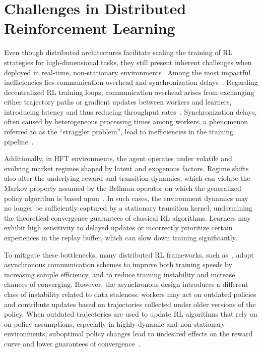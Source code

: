 \section{Challenges in Distributed Reinforcement Learning}
\label{sec:challenges}

Even though distributed architectures facilitate scaling the training of RL strategies for
high-dimensional tasks, they still present inherent challenges when deployed in real-time, non-stationary environments~\citep{He2022, Jia2024}
Among the most impactful inefficiencies lies communication overhead and synchronization delays~\citep{Song2023}.
Regarding decentralized RL training loops, communication overhead arises from exchanging either trajectory paths or gradient updates
between workers and learners, introducing latency and thus reducing throughput rates~\citep{Espeholt2018}.
Synchronization delays, often caused by heterogeneous processing times among workers, a phenomenon referred to as the ``straggler problem'',
lead to inefficiencies in the training pipeline~\citep{Lu2021}.

Additionally, in HFT environments, the agent operates under volatile and evolving market regimes shaped by latent and exogenous factors.
Regime shifts also alter the underlying reward and transition dynamics, which can violate the Markov property assumed by the Bellman operator
on which the generalized policy algorithm is based upon~\citep{Rabindrajit2024}.
In such cases, the environment dynamics may no longer be sufficiently captured by a stationary transition kernel,
undermining the theoretical convergence guarantees of classical RL algorithms.
Learners may exhibit high sensitivity to delayed updates or incorrectly prioritize certain experiences in the replay buffer,
which can slow down training significantly.

To mitigate these bottlenecks, many distributed RL frameworks, such as~\cite{Espeholt2018, Mnih2016, Paine2019},
adopt asynchronous communication schemes
to improve both training speeds by increasing sample efficiency, and to reduce training instability and increase chances of converging.
However, the asynchronous design introduces a different class of instability related to data staleness:
workers may act on outdated policies and contribute updates based on trajectories collected under older versions of the policy.
When outdated trajectories are used to update RL algorithms that rely on on-policy assumptions,
especially in highly dynamic and non-stationary environments,
suboptimal policy changes lead to undesired effects on the reward curve and lower guarantees of convergence~\citep{Dai2018}.

